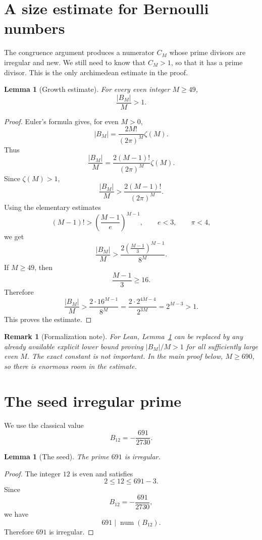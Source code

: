 \documentclass[11pt]{article}
\newtheorem{lemma}[theorem]{Lemma}
\newtheorem{remark}[theorem]{Remark}
\newcommand{\num}{\operatorname{num}}
\begin{document}
\section{A size estimate for Bernoulli numbers}

The congruence argument produces a numerator $C_M$ whose prime divisors are irregular and new.  We still need to know that $C_M>1$, so that it has a prime divisor.  This is the only archimedean estimate in the proof.

\begin{lemma}[Growth estimate]\label{lem:growth}
For every even integer $M\ge49$,
\[
  \frac{|B_M|}{M}>1.
\]
\end{lemma}

\begin{proof}
Euler's formula gives, for even $M>0$,
\[
  |B_M|=\frac{2M!}{(2\pi)^M}\zeta(M).
\]
Thus
\[
  \frac{|B_M|}{M}
  =\frac{2(M-1)!}{(2\pi)^M}\zeta(M).
\]
Since $\zeta(M)>1$,
\[
  \frac{|B_M|}{M}>
  \frac{2(M-1)!}{(2\pi)^M}.
\]
Using the elementary estimates
\[
  (M-1)!>\left(\frac{M-1}{e}\right)^{M-1},
  \qquad e<3,
  \qquad \pi<4,
\]
we get
\[
  \frac{|B_M|}{M}
  >\frac{2\left(\frac{M-1}{3}\right)^{M-1}}{8^M}.
\]
If $M\ge49$, then
\[
  \frac{M-1}{3}\ge16.
\]
Therefore
\[
  \frac{|B_M|}{M}
  >\frac{2\cdot 16^{M-1}}{8^M}
  =\frac{2\cdot 2^{4M-4}}{2^{3M}}
  =2^{M-3}>1.
\]
This proves the estimate.
\end{proof}

\begin{remark}[Formalization note]
For Lean, Lemma~\ref{lem:growth} can be replaced by any already available explicit lower bound proving $|B_M|/M>1$ for all sufficiently large even $M$.  The exact constant is not important.  In the main proof below, $M\ge690$, so there is enormous room in the estimate.
\end{remark}

\section{The seed irregular prime}

We use the classical value
\[
  B_{12}=-\frac{691}{2730}.
\]

\begin{lemma}[The seed]
The prime $691$ is irregular.
\end{lemma}

\begin{proof}
The integer $12$ is even and satisfies
\[
  2\le 12\le 691-3.
\]
Since
\[
  B_{12}=-\frac{691}{2730},
\]
we have
\[
  691\mid \num(B_{12}).
\]
Therefore $691$ is irregular.
\end{proof}
\end{document}
